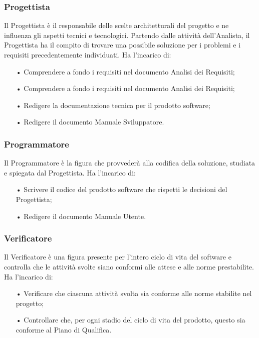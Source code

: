 \subsubsection{Progettista}
Il Progettista è il responsabile delle scelte architetturali del progetto e ne influenza gli aspetti tecnici e tecnologici.  
\newline
Partendo dalle attività dell'Analista, il Progettista ha il compito di trovare una possibile soluzione per i problemi e i requisiti precedentemente individuati. 
\newline
Ha l’incarico di:
\begin{itemize}
\item[•] Comprendere a fondo i requisiti nel documento Analisi dei Requisiti;
\item[•] Comprendere a fondo i requisiti nel documento Analisi dei Requisiti;
\item[•] Redigere la documentazione tecnica per il prodotto software;
\item[•] Redigere il documento Manuale Sviluppatore.
\end{itemize}

\subsubsection{Programmatore}
Il Programmatore è la figura che provvederà alla codifica della soluzione, studiata e spiegata dal Progettista.  
\newline
Ha l’incarico di:
\begin{itemize}
\item[•] Scrivere il codice del prodotto software che rispetti le decisioni del Progettista;
\item[•] Redigere il documento Manuale Utente.
\end{itemize}

\subsubsection{Verificatore}
Il Verificatore è una figura presente per l'intero ciclo di vita del software e controlla che le attività svolte siano conformi alle attese e alle norme prestabilite.  
\newline
Ha l’incarico di:
\begin{itemize}
\item[•] Verificare che ciascuna attività svolta sia conforme alle norme stabilite nel progetto;
\item[•] Controllare che, per ogni stadio del ciclo di vita del prodotto, questo sia conforme al Piano di Qualifica.
\end{itemize}

